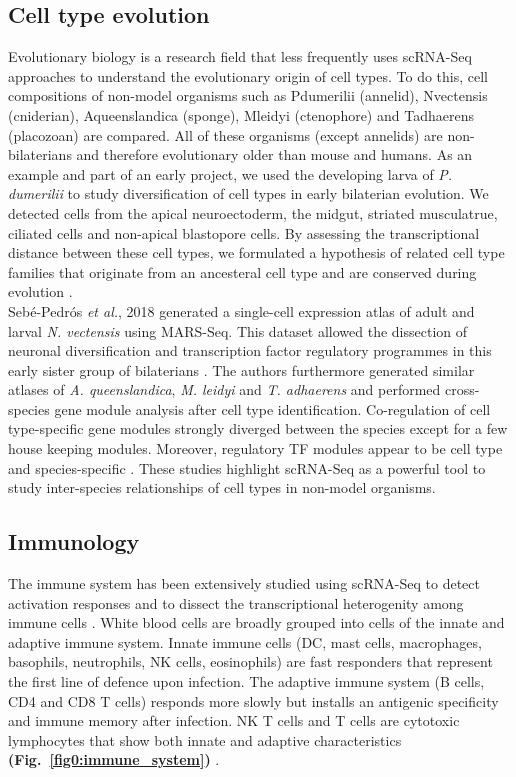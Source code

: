 \subsection{Cell type evolution} 

Evolutionary biology is a research field that less frequently uses scRNA-Seq approaches to understand the evolutionary origin of cell types. To do this, cell compositions of non-model organisms such as \gls{Pdumerilii} (annelid), \gls{Nvectensis} (cniderian), \gls{Aqueenslandica} (sponge), \gls{Mleidyi} (ctenophore) and \gls{Tadhaerens} (placozoan) are compared. All of these organisms (except annelids) are non-bilaterians and therefore evolutionary older than mouse and humans. As an example and part of an early project, we used the developing larva of \textit{P. dumerilii} to study diversification of cell types in early bilaterian evolution. We detected cells from the apical neuroectoderm, the midgut, striated musculatrue, ciliated cells and non-apical blastopore cells. By assessing the transcriptional distance between these cell types, we formulated a hypothesis of related cell type families that originate from an ancesteral cell type and are conserved during evolution \citep{Achim2018}.  \\

Seb\'e{}-Pedr\'o{}s \emph{et al.}, 2018 generated a single-cell expression atlas of adult and larval \textit{N. vectensis} using MARS-Seq. This dataset allowed the dissection of neuronal diversification and transcription factor regulatory programmes in this early sister group of bilaterians \citep{Sebe-Pedros2018}. The authors furthermore generated similar atlases of \textit{A. queenslandica}, \textit{M. leidyi} and \textit{T. adhaerens} and performed cross-species gene module analysis after cell type identification. Co-regulation of cell type-specific gene modules strongly diverged between the species except for a few house keeping modules. Moreover, regulatory TF modules appear to be cell type and species-specific \citep{Sebe-Pedros2018a}. These studies highlight scRNA-Seq as a powerful tool to study inter-species relationships of cell types in non-model organisms. 

\subsection{Immunology}

The immune system has been extensively studied using scRNA-Seq to detect activation responses and to dissect the transcriptional heterogenity among immune cells \citep{Proserpio2015, Satija2014}. White blood cells are broadly grouped into cells of the innate and adaptive immune system. Innate immune cells (\gls{DC}, mast cells, macrophages, basophils, neutrophils, \gls{NK} cells, eosinophils) are fast responders that represent the first line of defence upon infection. The adaptive immune system (B cells, CD4\plus{} and CD8\plus{} T cells) responds more slowly but installs an antigenic specificity and immune memory after infection. \gls{NK} T cells and \textgamma{}\textdelta{} T cells are cytotoxic lymphocytes that show both innate and adaptive characteristics \textbf{(Fig.~\ref{fig0:immune_system})} \citep{Dranoff2004}. 

